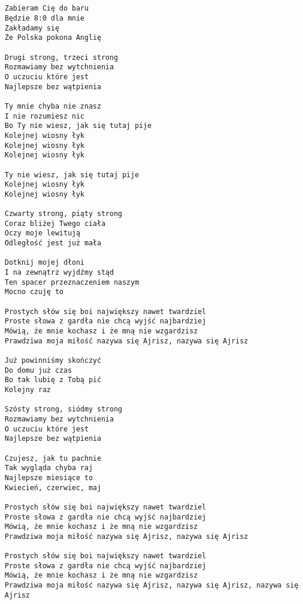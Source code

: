 \documentclass[12pt]{article}
\begin{document}
\subsection*{}
\begin{verbatim}
Zabieram Cię do baru
Będzie 8:0 dla mnie
Zakładamy się
Że Polska pokona Anglię

Drugi strong, trzeci strong
Rozmawiamy bez wytchnienia
O uczuciu które jest
Najlepsze bez wątpienia

Ty mnie chyba nie znasz
I nie rozumiesz nic
Bo Ty nie wiesz, jak się tutaj pije
Kolejnej wiosny łyk
Kolejnej wiosny łyk
Kolejnej wiosny łyk

Ty nie wiesz, jak się tutaj pije
Kolejnej wiosny łyk
Kolejnej wiosny łyk

Czwarty strong, piąty strong
Coraz bliżej Twego ciała
Oczy moje lewitują
Odległość jest już mała

Dotknij mojej dłoni
I na zewnątrz wyjdźmy stąd
Ten spacer przeznaczeniem naszym
Mocno czuję to

Prostych słów się boi największy nawet twardziel
Proste słowa z gardła nie chcą wyjść najbardziej
Mówią, że mnie kochasz i że mną nie wzgardzisz
Prawdziwa moja miłość nazywa się Ajrisz, nazywa się Ajrisz

Już powinniśmy skończyć
Do domu już czas
Bo tak lubię z Tobą pić
Kolejny raz

Szósty strong, siódmy strong
Rozmawiamy bez wytchnienia
O uczuciu które jest
Najlepsze bez wątpienia

Czujesz, jak tu pachnie
Tak wygląda chyba raj
Najlepsze miesiące to
Kwiecień, czerwiec, maj

Prostych słów się boi największy nawet twardziel
Proste słowa z gardła nie chcą wyjść najbardziej
Mówią, że mnie kochasz i że mną nie wzgardzisz
Prawdziwa moja miłość nazywa się Ajrisz, nazywa się Ajrisz

Prostych słów się boi największy nawet twardziel
Proste słowa z gardła nie chcą wyjść najbardziej
Mówią, że mnie kochasz i że mną nie wzgardzisz
Prawdziwa moja miłość nazywa się Ajrisz, nazywa się Ajrisz, nazywa się Ajrisz
\end{verbatim}
\clearpage
\end{document}
